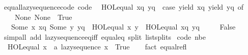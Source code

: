 \begin{isabellebody}
\endisatagproof
{\isafoldproof}%
%
\isadelimproof
\isanewline
%
\endisadelimproof
\isanewline
{}\isamarkupfalse%
\ equal{\isacharunderscore}{\kern0pt}lazy{\isacharunderscore}{\kern0pt}sequence{\isacharunderscore}{\kern0pt}code\ {\isacharbrackleft}{\kern0pt}code{\isacharbrackright}{\kern0pt}{\isacharcolon}{\kern0pt}\isanewline
\ \ {\isachardoublequoteopen}HOL{\isachardot}{\kern0pt}equal\ xq\ yq\ {\isacharequal}{\kern0pt}\ {\isacharparenleft}{\kern0pt}case\ {\isacharparenleft}{\kern0pt}yield\ xq{\isacharcomma}{\kern0pt}\ yield\ yq{\isacharparenright}{\kern0pt}\ of\isanewline
\ \ \ \ {\isacharparenleft}{\kern0pt}None{\isacharcomma}{\kern0pt}\ None{\isacharparenright}{\kern0pt}\ {\isasymRightarrow}\ True\isanewline
\ \ {\isacharbar}{\kern0pt}\ {\isacharparenleft}{\kern0pt}Some\ {\isacharparenleft}{\kern0pt}x{\isacharcomma}{\kern0pt}\ xq{\isacharprime}{\kern0pt}{\isacharparenright}{\kern0pt}{\isacharcomma}{\kern0pt}\ Some\ {\isacharparenleft}{\kern0pt}y{\isacharcomma}{\kern0pt}\ yq{\isacharprime}{\kern0pt}{\isacharparenright}{\kern0pt}{\isacharparenright}{\kern0pt}\ {\isasymRightarrow}\ HOL{\isachardot}{\kern0pt}equal\ x\ y\ {\isasymand}\ HOL{\isachardot}{\kern0pt}equal\ xq\ yq\isanewline
\ \ {\isacharbar}{\kern0pt}\ {\isacharunderscore}{\kern0pt}\ {\isasymRightarrow}\ False{\isacharparenright}{\kern0pt}{\isachardoublequoteclose}\isanewline
%
\isadelimproof
\ \ %
\endisadelimproof
%
\isatagproof
{}\isamarkupfalse%
\ {\isacharparenleft}{\kern0pt}simp{\isacharunderscore}{\kern0pt}all\ add{\isacharcolon}{\kern0pt}\ lazy{\isacharunderscore}{\kern0pt}sequence{\isacharunderscore}{\kern0pt}eq{\isacharunderscore}{\kern0pt}iff\ equal{\isacharunderscore}{\kern0pt}eq\ split{\isacharcolon}{\kern0pt}\ list{\isachardot}{\kern0pt}splits{\isacharparenright}{\kern0pt}%
\endisatagproof
{\isafoldproof}%
%
\isadelimproof
\isanewline
%
\endisadelimproof
\isanewline
{}\isamarkupfalse%
\ {\isacharbrackleft}{\kern0pt}code\ nbe{\isacharbrackright}{\kern0pt}{\isacharcolon}{\kern0pt}\isanewline
\ \ {\isachardoublequoteopen}HOL{\isachardot}{\kern0pt}equal\ {\isacharparenleft}{\kern0pt}x\ {\isacharcolon}{\kern0pt}{\isacharcolon}{\kern0pt}\ {\isacharprime}{\kern0pt}a\ lazy{\isacharunderscore}{\kern0pt}sequence{\isacharparenright}{\kern0pt}\ x\ {\isasymlongleftrightarrow}\ True{\isachardoublequoteclose}\isanewline
%
\isadelimproof
\ \ %
\endisadelimproof
%
\isatagproof
{}\isamarkupfalse%
\ {\isacharparenleft}{\kern0pt}fact\ equal{\isacharunderscore}{\kern0pt}refl{\isacharparenright}{\kern0pt}%
\endisatagproof
{\isafoldproof}%
%
\isadelimproof

\end{isabellebody}
